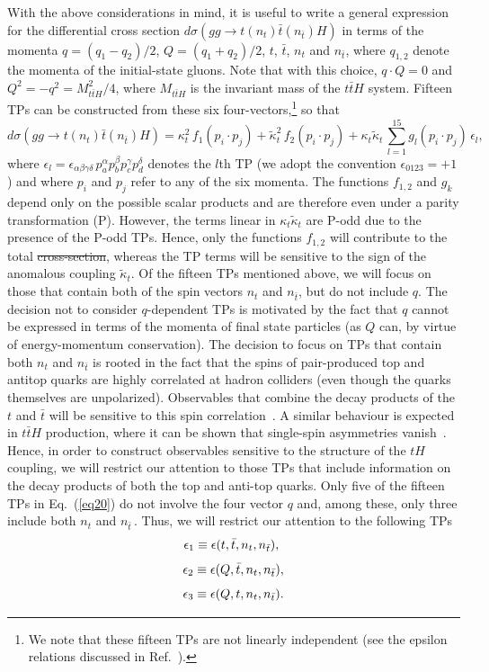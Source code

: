 \documentclass[aps,preprint,tightenlines,floatfix,superscriptaddress,nofootinbib,showpacs]{revtex4-1}
\def\beq{\begin{equation}}
\def\eeq{\end{equation}}
\def\tbar{\bar{t}}
\def\kp{\kappa_t}
\def\kpt{\tilde{\kappa}_t}
\providecommand{\DIFadd}[1]{{\protect\color{blue}\uwave{#1}}} %
\providecommand{\DIFdel}[1]{{\protect\color{red}\sout{#1}}}                      %
\providecommand{\DIFaddbegin}{} %
\providecommand{\DIFaddend}{} %
\providecommand{\DIFdelbegin}{} %
\providecommand{\DIFdelend}{} %
\begin{document}
With the above considerations in mind, it is useful to
write a general expression for the differential cross
section $d\sigma(gg\to t(n_t)\tbar (n_{\tbar})H)$
in terms of the momenta $q=(q_1-q_2)/2$,
$Q=(q_1+q_2)/2$, $t$, $\bar{t}$, $n_t$ and $n_{\tbar}$, where
$q_{1,2}$ denote the momenta of the initial-state gluons. Note that with this
choice, $q\cdot Q=0$ and $Q^2=-q^2=M^2_{t\tbar H}/4$, where $M_{t\tbar
  H}$ is the invariant mass of the $t\tbar H$ system.
Fifteen TPs can be constructed from these six
four-vectors,\footnote{We note that these fifteen
  TPs are not linearly independent (see the epsilon relations
  discussed in Ref.~\cite{identities}).} so that
%
\beq
\label{eq20}
d\sigma(gg\to t(n_t)\tbar (n_{\tbar})H)= \kp^2\,f_1(p_i\cdot p_j)+\tilde{\kappa}^2_t\,f_2(p_i\cdot p_j)+\kp\kpt\,\sum^{15}_{l=1}g_l(p_i\cdot p_j)\,\epsilon_l,
\eeq   
%
where
$\epsilon_l=\epsilon_{\alpha\beta\gamma\delta}\,p^{\alpha}_ap^{\beta}_bp^{\gamma}_cp^{\delta}_d$
denotes the $l$th TP (we adopt the convention $\epsilon_{0123}=+1$) and where $p_i$ and $p_j$ refer to any of the
six momenta.  The
functions $f_{1,2}$ and $g_k$ depend only on the possible scalar
products and are therefore even under a parity transformation
($\mathrm{P}$). However, the terms linear in $\kp\kpt$ are
$\mathrm{P}$-odd due to the presence of the $\mathrm{P}$-odd
TPs. Hence, only the functions $f_{1,2}$ will contribute to the total
\DIFdelbegin \DIFdel{cross-section}\DIFdelend \DIFaddbegin \DIFadd{cross section}\DIFaddend , whereas the TP terms will be sensitive to the sign of
the anomalous coupling $\kpt$. Of the fifteen TPs mentioned above,
we will focus on those that contain both of the spin
vectors $n_t$ and $n_{\tbar}$, but do not include $q$.
The decision not to consider $q$-dependent TPs is motivated by the fact
that $q$ cannot be expressed in terms of the momenta of final state
particles (as $Q$ can, by virtue of energy-momentum conservation). The
decision to focus on TPs that contain both $n_t$ and $n_{\tbar}$
is rooted in the fact that the spins of pair-produced top and antitop quarks
are highly correlated at hadron colliders 
(even though the quarks themselves are unpolarized).
Observables that combine the decay products of the
$t$ and $\tbar$ will be sensitive to this spin
correlation~\cite{Bernreuther}.  A similar behaviour is expected in $t\tbar H$
production, where it can be shown that single-spin asymmetries
vanish~\cite{Ellis,Biswas}. Hence, in order to construct observables
sensitive to the structure of the $tH$ coupling, we will restrict our attention
to those
TPs that include information on the decay products of both the top and
anti-top quarks. Only five of the fifteen TPs in Eq.~(\ref{eq20}) do
not involve the four vector $q$ and, among these, only three
include both $n_t$ and $n_{\tbar}\,$.  Thus, we will restrict our attention
to the following TPs
%
\beq
\label{eqa1}
\epsilon_1\equiv\epsilon(t,\tbar,n_t,n_{\tbar}),\,\,
\vspace*{1mm}
\eeq
%
\beq
\label{eqa2}
\epsilon_2\equiv\epsilon(Q,\tbar,n_t,n_{\tbar}),
\vspace*{1mm}
\eeq
%
\beq
\label{eqa3}
\epsilon_3\equiv\epsilon(Q,t,n_t,n_{\tbar}).
\vspace*{1mm}
\eeq
%
\par  
\end{document}
